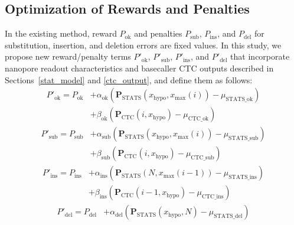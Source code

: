 \documentclass[sotsuron]{kuee}
\begin{document}
\subsection{Optimization of Rewards and Penalties} \label{reward_penalty_optimization}
In the existing method, reward $P_{\mathrm{ok}}$ and penalties
$P_{\mathrm{sub}}$, $P_{\mathrm{ins}}$, and $P_{\mathrm{del}}$ for
substitution, insertion, and deletion errors are fixed values.
In this study, we propose new reward/penalty terms
$P'_{\mathrm{ok}}$, $P'_{\mathrm{sub}}$, $P'_{\mathrm{ins}}$, and
$P'_{\mathrm{del}}$ that incorporate nanopore readout characteristics and
basecaller CTC outputs described in Sections~\ref{stat_model} and
\ref{ctc_output}, and define them as follows:
\begin{equation}
  \begin{split}
    P'_{\mathrm{ok}} = P_{\mathrm{ok}} &+ \alpha_{\mathrm{ok}}(\bm{P}_{\mathrm{STATS}}(x_{\mathrm{hypo}}, x_{\mathrm{max}}(i))-\mu_{\mathrm{STATS}\_\mathrm{ok}}) \label{opt1} \\ 
     &+ \beta_{\mathrm{ok}}(\bm{P}_{\mathrm{CTC}}(i, x_{\mathrm{hypo}})-\mu_{\mathrm{CTC}\_\mathrm{ok}}) 
  \end{split}
\end{equation}
\begin{equation}
  \begin{split}
    P'_{\mathrm{sub}} = P_{\mathrm{sub}} &+ \alpha_{\mathrm{sub}}(\bm{P}_{\mathrm{STATS}}(x_{\mathrm{hypo}}, x_{\mathrm{max}}(i))-\mu_{\mathrm{STATS}\_\mathrm{sub}}) \label{opt2} \\
    &+ \beta_{\mathrm{sub}}(\bm{P}_{\mathrm{CTC}}(i, x_{\mathrm{hypo}})-\mu_{\mathrm{CTC}\_\mathrm{sub}})
  \end{split}
\end{equation}
\begin{equation}
  \begin{split}
    P'_{\mathrm{ins}} = P_{\mathrm{ins}} &+ \alpha_{\mathrm{ins}}(\bm{P}_{\mathrm{STATS}}(N, x_{\mathrm{max}}(i-1))-\mu_{\mathrm{STATS}\_\mathrm{ins}}) \label{opt3}\\
    &+ \beta_{\mathrm{ins}}(\bm{P}_{\mathrm{CTC}}(i-1, x_{\mathrm{hypo}})-\mu_{\mathrm{CTC}\_\mathrm{ins}})
  \end{split}
\end{equation}
\begin{equation}
  \begin{split}
    P'_{\mathrm{del}} = P_{\mathrm{del}} &+ \alpha_{\mathrm{del}}(\bm{P}_{\mathrm{STATS}}(x_{\mathrm{hypo}}, N)-\mu_{\mathrm{STATS}\_\mathrm{del}}) \label{opt4}
  \end{split}
\end{equation}
\end{document}
